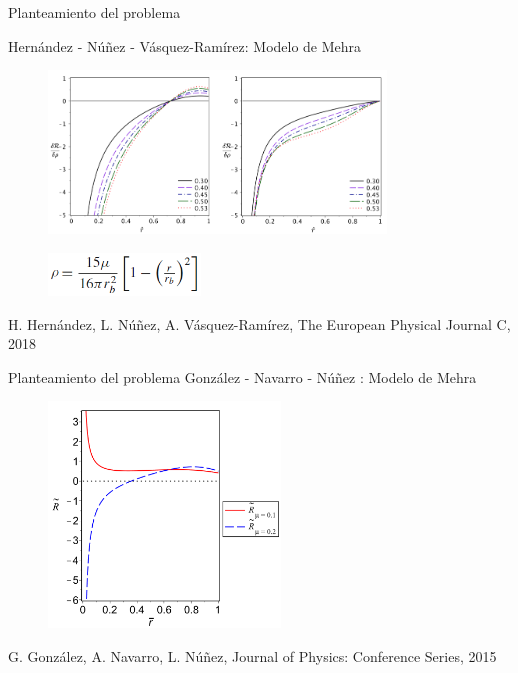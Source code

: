 \documentclass[handout,t]{beamer}
\begin{document}
\begin{frame}{Planteamiento del problema}

\centering Hernández - Núñez - Vásquez-Ramírez: Modelo de Mehra


\begin{figure}[h]
\includegraphics[width=0.8\textwidth]{FracturasConv2.png}
\end{figure}

\vspace{-3mm}

\begin{figure}[h]
\includegraphics[width=0.36\textwidth]{Mehra.png}
\end{figure}

\tiny H. Hernández, L. Núñez, A. Vásquez-Ramírez, The European Physical Journal C, 2018


\end{frame}


\begin{frame}{Planteamiento del problema}
\vspace{-2mm}
\centering González - Navarro - Núñez : Modelo de Mehra


\begin{figure}[h]
\includegraphics[width=0.55\textwidth]{Mehra2.png}
\end{figure}

\tiny G. González, A. Navarro, L. Núñez, Journal of Physics: Conference Series, 2015

\end{frame}
\end{document}
